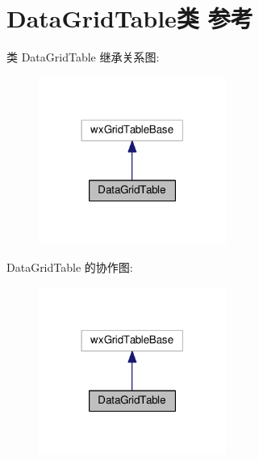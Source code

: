 \hypertarget{class_data_grid_table}{\section{Data\+Grid\+Table类 参考}
\label{class_data_grid_table}
}


类 Data\+Grid\+Table 继承关系图\+:
\nopagebreak
\begin{figure}[H]
\begin{center}
\leavevmode
\includegraphics[width=174pt]{class_data_grid_table__inherit__graph}
\end{center}
\end{figure}


Data\+Grid\+Table 的协作图\+:
\nopagebreak
\begin{figure}[H]
\begin{center}
\leavevmode
\includegraphics[width=174pt]{class_data_grid_table__coll__graph}
\end{center}
\end{figure}
